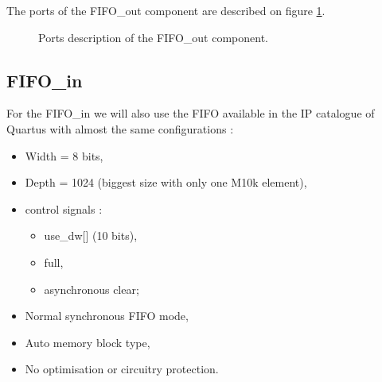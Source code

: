 \documentclass[11pt]{article}
\begin{document}
The ports of the FIFO\_out component are described on figure \ref{fifo_out_ports}.
\begin{figure}[H]
        \caption{Ports description of the FIFO\_out component.}
        \label{fifo_out_ports}
\end{figure}

\subsection{FIFO\_in}
For the FIFO\_in we will also use the FIFO available in the IP catalogue of Quartus with almost the same configurations :
\begin{itemize}
    \item Width = 8 bits,
    \item Depth = 1024 (biggest size with only one M10k element),
    \item control signals : \begin{itemize}
        \item use\_dw[] (10 bits),
        \item full,
        \item asynchronous clear; \end{itemize}
    \item Normal synchronous FIFO mode,
    \item Auto memory block type,
    \item No optimisation or circuitry protection.
\end{itemize}
\end{document}
